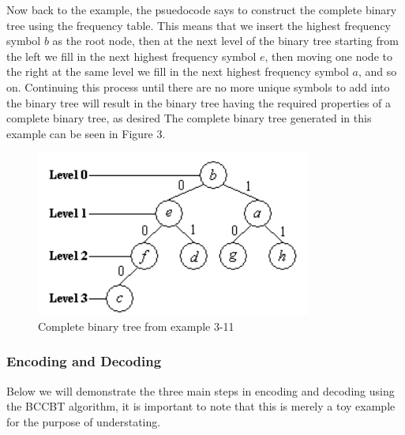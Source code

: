 \documentclass[12pt]{IEEEtran}
\begin{document}
Now back to the example, the psuedocode says to construct the complete
binary tree using the frequency table. This means that we insert the highest frequency symbol $b$ as the root node, then at the
next level of the binary tree starting from the left we fill in the next highest frequency symbol $e$, then moving one node to
the right at the same level we fill in the next highest frequency symbol $a$, and so on. Continuing this process until there are no
more unique symbols to add into the binary tree will result in the binary tree having the required properties of a complete binary tree,
as desired
The complete binary tree generated in this example can be seen in Figure 3.\\
\begin{figure}
\centering
\includegraphics[scale=0.6]{../presentation/images/completebinarytree.PNG}
\caption{Complete binary tree from example 3-11 \cite{Sjostrand}}
\end{figure}

\subsubsection{Encoding and Decoding}
Below we will demonstrate the three main steps in encoding and decoding using the BCCBT algorithm, it is important
to note that this is merely a toy example for the purpose of understating. \\
\end{document}
